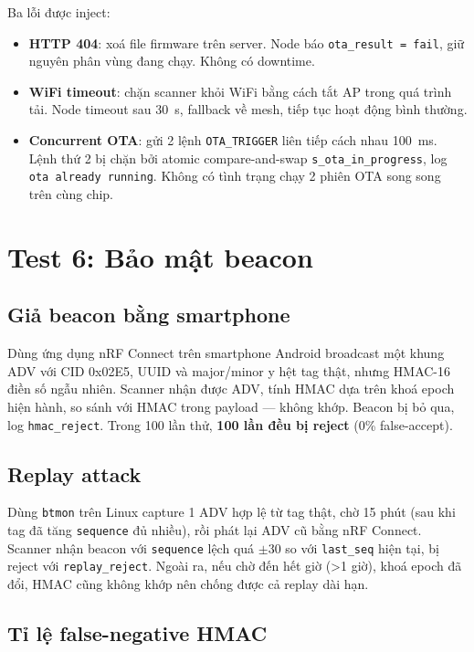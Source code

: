 Ba lỗi được inject:

\begin{itemize}
    \item \textbf{HTTP 404}: xoá file firmware trên server. Node báo \texttt{ota\_result = fail}, giữ nguyên phân vùng đang chạy. Không có downtime.
    \item \textbf{WiFi timeout}: chặn scanner khỏi WiFi bằng cách tắt AP trong quá trình tải. Node timeout sau 30~s, fallback về mesh, tiếp tục hoạt động bình thường.
    \item \textbf{Concurrent OTA}: gửi 2 lệnh \texttt{OTA\_TRIGGER} liên tiếp cách nhau 100~ms. Lệnh thứ 2 bị chặn bởi atomic compare-and-swap \texttt{s\_ota\_in\_progress}, log \texttt{ota already running}. Không có tình trạng chạy 2 phiên OTA song song trên cùng chip.
\end{itemize}

\section{Test 6: Bảo mật beacon}

\subsection{Giả beacon bằng smartphone}

Dùng ứng dụng nRF Connect trên smartphone Android broadcast một khung ADV với CID 0x02E5, UUID và major/minor y hệt tag thật, nhưng HMAC-16 điền số ngẫu nhiên. Scanner nhận được ADV, tính HMAC dựa trên khoá epoch hiện hành, so sánh với HMAC trong payload — không khớp. Beacon bị bỏ qua, log \texttt{hmac\_reject}. Trong 100 lần thử, \textbf{100 lần đều bị reject} (0\% false-accept).

\subsection{Replay attack}

Dùng \texttt{btmon} trên Linux capture 1 ADV hợp lệ từ tag thật, chờ 15 phút (sau khi tag đã tăng \texttt{sequence} đủ nhiều), rồi phát lại ADV cũ bằng nRF Connect. Scanner nhận beacon với \texttt{sequence} lệch quá $\pm 30$ so với \texttt{last\_seq} hiện tại, bị reject với \texttt{replay\_reject}. Ngoài ra, nếu chờ đến hết giờ (>1 giờ), khoá epoch đã đổi, HMAC cũng không khớp nên chống được cả replay dài hạn.

\subsection{Tỉ lệ false-negative HMAC}

